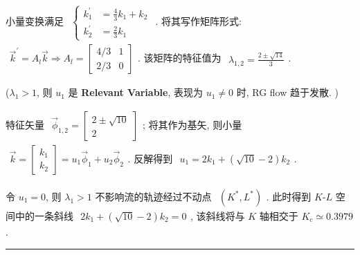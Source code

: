 \documentclass[../../main.tex]{subfiles}
\begin{document}
小量变换满足 $\begin{aligned}
    \left\{\begin{aligned}
        k_{1}^{\prime} &= \frac{4}{3}k_{1} + k_{2}\\
        k_{2}^{\prime} &= \frac{2}{3}k_{1}
    \end{aligned}\right.
\end{aligned}$. 将其写作矩阵形式: $\begin{aligned}
    \vec{k}^{\prime} = A_{l}\vec{k}\Rightarrow A_{l} = \begin{bmatrix}
        4/3 & 1 \\
        2/3 & 0
    \end{bmatrix}
\end{aligned}$. 该矩阵的特征值为 $\begin{aligned}
    \lambda_{1,2} = \frac{2\pm\sqrt{14}}{3}
\end{aligned}$. 

($\lambda_{1}>1$, 则 $u_{1}$ 是 \textbf{Relevant Variable}, 表现为 $u_{1}\neq 0$ 时, RG flow 趋于发散. )

特征矢量 $\begin{aligned}
    \vec{\phi}_{1,2} = \begin{bmatrix}
        2 \pm \sqrt{10}\\
        2
    \end{bmatrix}
\end{aligned}$; 将其作为基矢, 则小量 $\begin{aligned}
    \vec{k} = \begin{bmatrix}
        k_{1}\\k_{2}
    \end{bmatrix} = u_{1}\vec{\phi}_{1} + u_{2}\vec{\phi}_{2}
\end{aligned}$. 反解得到 $\begin{aligned}
    u_{1} = 2k_{1} + (\sqrt{10}-2)k_{2}
\end{aligned}$. 

令 $u_{1}=0$, 则 $\lambda_{1}>1$ 不影响流的轨迹经过不动点 $\begin{aligned}
    \left(K^{*},L^{*}\right)
\end{aligned}$. 此时得到 $K$-$L$ 空间中的一条斜线 $\begin{aligned}
    2k_{1} + (\sqrt{10}-2)k_{2} = 0
\end{aligned}$, 该斜线将与 $K$ 轴相交于 $ K_{c}\simeq 0.3979$.


\vspace{0.5em}\hrule\vspace{0.5em}
\end{document}
